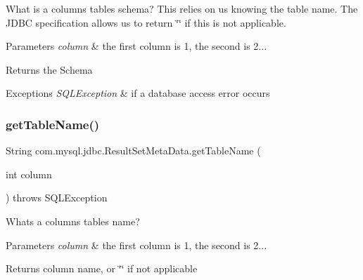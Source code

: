 What is a column\textquotesingle{}s table\textquotesingle{}s schema? This relies on us knowing the table name. The J\+D\+BC specification allows us to return \char`\"{}\char`\"{} if this is not applicable.


\begin{DoxyParams}{Parameters}
{\em column} & the first column is 1, the second is 2...\\
\hline
\end{DoxyParams}
\begin{DoxyReturn}{Returns}
the Schema
\end{DoxyReturn}

\begin{DoxyExceptions}{Exceptions}
{\em S\+Q\+L\+Exception} & if a database access error occurs \\
\hline
\end{DoxyExceptions}
\mbox{\label{classcom_1_1mysql_1_1jdbc_1_1_result_set_meta_data_a7b6a0a4f9aa6cc3901bfeb54c85fe888}} 
\subsubsection{\texorpdfstring{get\+Table\+Name()}{getTableName()}}
{\footnotesize\ttfamily String com.\+mysql.\+jdbc.\+Result\+Set\+Meta\+Data.\+get\+Table\+Name (\begin{DoxyParamCaption}\item[{int}]{column }\end{DoxyParamCaption}) throws S\+Q\+L\+Exception}

Whats a column\textquotesingle{}s table\textquotesingle{}s name?


\begin{DoxyParams}{Parameters}
{\em column} & the first column is 1, the second is 2...\\
\hline
\end{DoxyParams}
\begin{DoxyReturn}{Returns}
column name, or \char`\"{}\char`\"{} if not applicable
\end{DoxyReturn}

